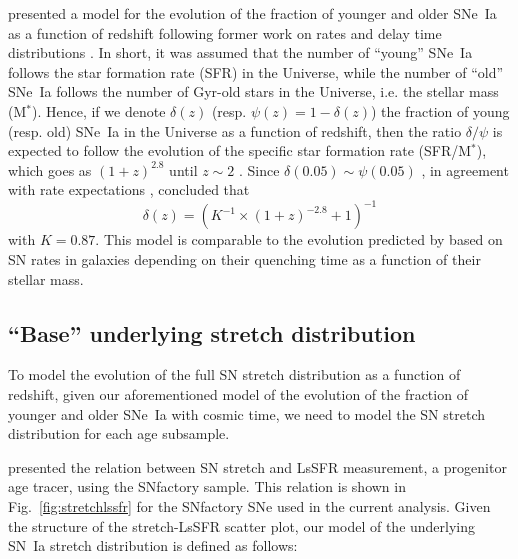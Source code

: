 \documentclass[]{aa}
\begin{document}
\cite{rigault2018} presented a model for the evolution of the fraction of
younger and older SNe~Ia as a function of redshift following former work on
rates and delay time distributions \citep[e.g.,][]{mannucci2005,
scannapieco2005, sullivan2006, aubourg2008, childress2014, maozmannucci2014}.
In short, it was assumed that the number of ``young'' SNe~Ia follows the star
formation rate (SFR) in the Universe, while the number of ``old'' SNe~Ia
follows the number of Gyr-old stars in the Universe, i.e. the stellar mass
(M$^*$). Hence, if we denote $\delta(z)$ (resp. $\psi(z) = 1-\delta(z)$) the
fraction of young (resp. old) SNe~Ia in the Universe as a function of redshift,
then the ratio $\delta/\psi$ is expected to follow the evolution of the specific
star formation rate (SFR/M$^*$), which goes as $(1+z)^{2.8}$ until $z\sim2$
\citep[e.g.,][]{tasca2015}. Since $\delta(0.05) \sim \psi(0.05)$
\citep{rigault2013,rigault2018,wiseman2020}, in agreement with rate expectations
\citep{mannucci2006,rodney2014}, \cite{rigault2018} concluded that
\begin{equation}
    \label{eq:delta}
    \delta(z) = \left( K^{-1} \times (1+z)^{-2.8} +1 \right)^{-1}
\end{equation}
with $K=0.87$. This model is comparable to the evolution predicted by
\cite{childress2014} based on SN rates in galaxies depending on their quenching
time as a function of their stellar mass.

\subsection{``Base'' underlying stretch distribution}
\label{sec:basemodel}

To model the evolution of the full SN stretch distribution as a function of
redshift, given our aforementioned model of the evolution of the fraction of
younger and older SNe~Ia with cosmic time, we need to model the SN stretch
distribution for each age subsample. 

\cite{rigault2018} presented the relation between SN stretch and LsSFR
measurement, a progenitor age tracer, using the SNfactory sample. This relation
is shown in Fig.~\ref{fig:stretchlssfr} for the SNfactory SNe used in the
current analysis. Given the structure of the stretch-LsSFR scatter plot, our
model of the underlying SN~Ia stretch distribution is defined as follows:
\end{document}

